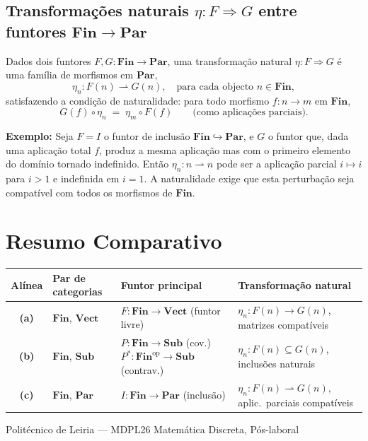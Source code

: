 \documentclass[12pt,a4paper]{article}
\newcommand{\catname}[1]{\mathbf{#1}}
\newcommand{\Fin}{\catname{Fin}}
\newcommand{\Vect}{\catname{Vect}}
\newcommand{\Sub}{\catname{Sub}}
\newcommand{\Par}{\catname{Par}}
\newcommand{\parto}{\rightharpoonup}  %
\begin{document}
\subsection{Transformações naturais \texorpdfstring{$\eta \colon F \Rightarrow G$}{eta: F => G} entre funtores \texorpdfstring{$\Fin \to \Par$}{Fin -> Par}}

Dados dois funtores $F, G \colon \Fin \to \Par$, uma transformação natural $\eta \colon F \Rightarrow G$ é uma família de morfismos em $\Par$,
\[
  \eta_n \colon F(n) \parto G(n), \quad \text{para cada objecto } n \in \Fin,
\]
satisfazendo a condição de naturalidade: para todo morfismo $f \colon n \to m$ em $\Fin$,
\[
  G(f) \circ \eta_n \;=\; \eta_m \circ F(f) \qquad \text{(como aplicações parciais)}.
\]

\noindent\textbf{Exemplo:} Seja $F = I$ o funtor de inclusão $\Fin \hookrightarrow \Par$, e $G$ o funtor que, dada uma aplicação total $f$, produz a mesma aplicação mas com o primeiro elemento do domínio tornado indefinido. Então $\eta_n \colon n \parto n$ pode ser a aplicação parcial $i \mapsto i$ para $i > 1$ e indefinida em $i = 1$. A naturalidade exige que esta perturbação seja compatível com todos os morfismos de $\Fin$.

\section{Resumo Comparativo}

\begin{center}
\renewcommand{\arraystretch}{1.4}
\begin{tabular}{>{\bfseries}c p{3.2cm} p{5cm} p{4.5cm}}
\toprule
\rowcolor{darkblue!85}
\color{white}Alínea & \color{white}Par de categorias & \color{white}Funtor principal & \color{white}Transformação natural \\
\midrule
\rowcolor{lightblue!60}
(a) & $\Fin$, $\Vect$ & $F \colon \Fin \to \Vect$ (funtor livre) & $\eta_n \colon F(n) \to G(n)$, matrizes compatíveis \\
\rowcolor{white}
(b) & $\Fin$, $\Sub$ & $P \colon \Fin \to \Sub$ (cov.) \newline $P^* \colon \Fin^{\mathrm{op}} \to \Sub$ (contrav.) & $\eta_n \colon F(n) \subseteq G(n)$, inclusões naturais \\
\rowcolor{lightblue!60}
(c) & $\Fin$, $\Par$ & $I \colon \Fin \to \Par$ (inclusão) & $\eta_n \colon F(n) \parto G(n)$, aplic.\ parciais compatíveis \\
\bottomrule
\end{tabular}
\end{center}

\vfill
\begin{center}
\color{gray}\small Politécnico de Leiria --- MDPL26 Matemática Discreta, Pós-laboral
\end{center}
\end{document}
